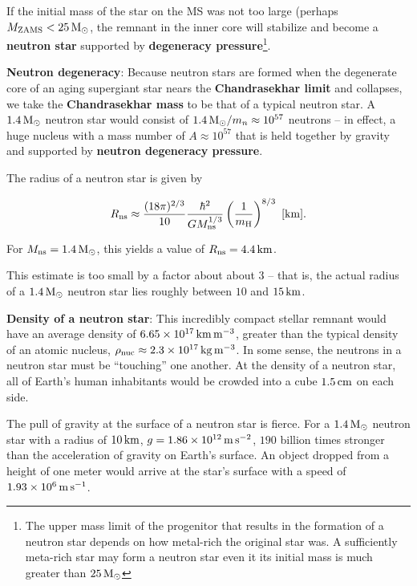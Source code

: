 \documentclass[a4paper,10pt]{article}
\begin{document}
{\noindent}If the initial mass of the star on the MS was not too large (perhaps $M_{\rm ZAMS}<25\,{\rm M_\odot}$, the remnant in the inner core will stabilize and become a \textbf{neutron star} supported by \textbf{degeneracy pressure}\footnote{The upper mass limit of the progenitor that results in the formation of a neutron star depends on how metal-rich the original star was. A sufficiently meta-rich star may form a neutron star even it its initial mass is much greater than $25\,{\rm M_\odot}$}.

{\noindent}\textbf{Neutron degeneracy}: Because neutron stars are formed when the degenerate core of an aging supergiant star nears the \textbf{Chandrasekhar limit} and collapses, we take the \textbf{Chandrasekhar mass} to be that of a typical neutron star. A $1.4\,{\rm M_\odot}$ neutron star would consist of $1.4\,{\rm M_\odot}/m_n\approx10^{57}$ neutrons -- in effect, a huge nucleus with a mass number of $A\approx10^{57}$ that is held together by gravity and supported by \textbf{neutron degeneracy pressure}.

{\noindent}The radius of a neutron star is given by

\begin{align*}
    R_{\rm ns} \approx \frac{(18\pi)^{2/3}}{10} \frac{\hbar^2}{GM_{\rm ns}^{1/3}} \left(\frac{1}{m_{\rm H}}\right)^{8/3} ~ [{\rm km}].
\end{align*}

{\noindent}For $M_{\rm ns}=1.4\,{\rm M_\odot}$, this yields a value of $R_{\rm ns}=4.4\,{\rm km}$.

{\noindent}This estimate is too small by a factor about about $3$ -- that is, the actual radius of a $1.4\,{\rm M_\odot}$ neutron star lies roughly between $10$ and $15\,{\rm km}$.

{\noindent}\textbf{Density of a neutron star}: This incredibly compact stellar remnant would have an average density of $6.65\times10^{17}\,{\rm km\,m^{-3}}$, greater than the typical density of an atomic nucleus, $\rho_{\rm nuc}\approx2.3\times10^{17}\,{\rm kg\,m^{-3}}$. In some sense, the neutrons in a neutron star must be ``touching'' one another. At the density of a neutron star, all of Earth's human inhabitants would be crowded into a cube $1.5\,{\rm cm}$ on each side.

{\noindent}The pull of gravity at the surface of a neutron star is fierce. For a $1.4\,{\rm M_\odot}$ neutron star with a radius of $10\,{\rm km}$, $g=1.86\times10^{12}\,{\rm m\,s^{-2}}$, $190$ billion times stronger than the acceleration of gravity on Earth's surface. An object dropped from a height of one meter would arrive at the star's surface with a speed of $1.93\times10^6\,{\rm m\,s^{-1}}$.
\end{document}

